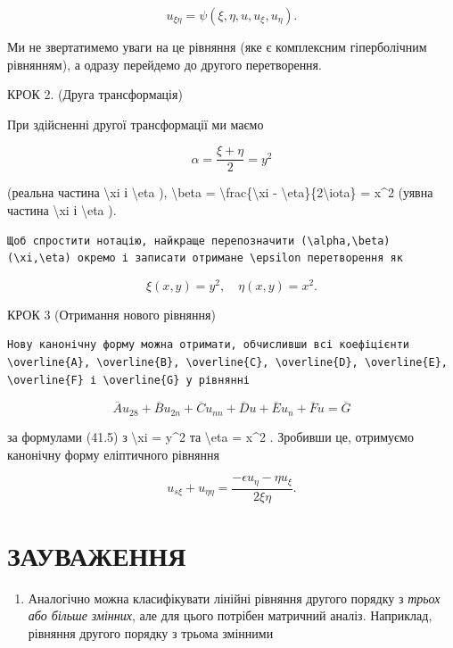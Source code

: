 \documentclass[
]{article}
\providecommand{\tightlist}{%
  \setlength{\itemsep}{0pt}\setlength{\parskip}{0pt}}
\begin{document}
\[
u_{\xi\eta} = \psi(\xi, \eta, u, u_{\xi}, u_{\eta}).
\]

Ми не звертатимемо уваги на це рівняння (яке є комплексним гіперболічним
рівнянням), а одразу перейдемо до другого перетворення.

КРОК 2. (Друга трансформація)

При здійсненні другої трансформації ми маємо

\[
\alpha = \frac{\xi + \eta}{2} = y^2
\]

(реальна частина \textbackslash xi і \textbackslash eta ),
\textbackslash beta = \textbackslash frac\{\textbackslash xi -
\textbackslash eta\}\{2\textbackslash iota\} = x\^{}2 (уявна частина
\textbackslash xi і \textbackslash eta ).

\begin{verbatim}
Щоб спростити нотацію, найкраще перепозначити (\alpha,\beta) (\xi,\eta) окремо і записати отримане \epsilon перетворення як
\end{verbatim}

\[
\xi(x, y) = y^2, \quad \eta(x, y) = x^2.
\]

КРОК 3 (Отримання нового рівняння)

\begin{verbatim}
Нову канонічну форму можна отримати, обчисливши всі коефіцієнти \overline{A}, \overline{B}, \overline{C}, \overline{D}, \overline{E}, \overline{F} і \overline{G} у рівнянні
\end{verbatim}

\[
\overline{A}u_{28} + \overline{B}u_{2n} + \overline{C}u_{nn} + \overline{D}u + \overline{E}u_{n} + \overline{F}u = \overline{G}
\]

за формулами (41.5) з \textbackslash xi = y\^{}2 та \textbackslash eta =
x\^{}2 . Зробивши це, отримуємо канонічну форму еліптичного рівняння

\[
u_{s\xi} + u_{\eta\eta} = \frac{-\epsilon u_{\eta} - \eta u_{\xi}}{2\xi\eta}.
\]

\section{ЗАУВАЖЕННЯ}\label{ux437ux430ux443ux432ux430ux436ux435ux43dux43dux44f}

\begin{enumerate}
\def\labelenumi{\arabic{enumi}.}
\tightlist
\item
  Аналогічно можна класифікувати лінійні рівняння другого порядку з
  \emph{трьох або більше змінних}, але для цього потрібен матричний
  аналіз. Наприклад, рівняння другого порядку з трьома змінними
\end{enumerate}
\end{document}
